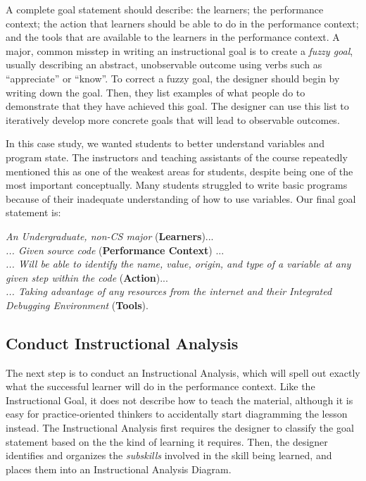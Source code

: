 \documentclass{sig-alternate}
\begin{document}
A complete goal statement should describe: the learners; the performance context; the action that learners should be able to do in the performance context; and the tools that are available to the learners in the performance context.
A major, common misstep in writing an instructional goal is to create a \textit{fuzzy goal}, usually describing an abstract, unobservable outcome using verbs such as ``appreciate'' or ``know''.
To correct a fuzzy goal, the designer should begin by writing down the goal.
Then, they list examples of what people do to demonstrate that they have achieved this goal.
The designer can use this list to iteratively develop more concrete goals that will lead to observable outcomes.

In this case study, we wanted students to better understand variables and program state.
The instructors and teaching assistants of the course repeatedly mentioned this as one of the weakest areas for students, despite being one of the most important conceptually.
Many students struggled to write basic programs because of their inadequate understanding of how to use variables.
Our final goal statement is:

\textit{An Undergraduate, non-CS major} (\textbf{Learners})...\\
\textit{... Given source code} (\textbf{Performance Context}) ...\\
\textit{... Will be able to identify the name, value, origin, and type of a variable at any given step within the code} (\textbf{Action})... \\
\textit{... Taking advantage of any resources from the internet and their Integrated Debugging Environment} (\textbf{Tools}).

\subsection{Conduct Instructional Analysis}

The next step is to conduct an Instructional Analysis, which will spell out exactly what the successful learner will do in the performance context.
Like the Instructional Goal, it does not describe how to teach the material, although it is easy for practice-oriented thinkers to accidentally start diagramming the lesson instead.
The Instructional Analysis first requires the designer to classify the goal statement based on the the kind of learning it requires.
Then, the designer identifies and organizes the \textit{subskills} involved in the skill being learned, and places them into an Instructional Analysis Diagram.
\end{document}
